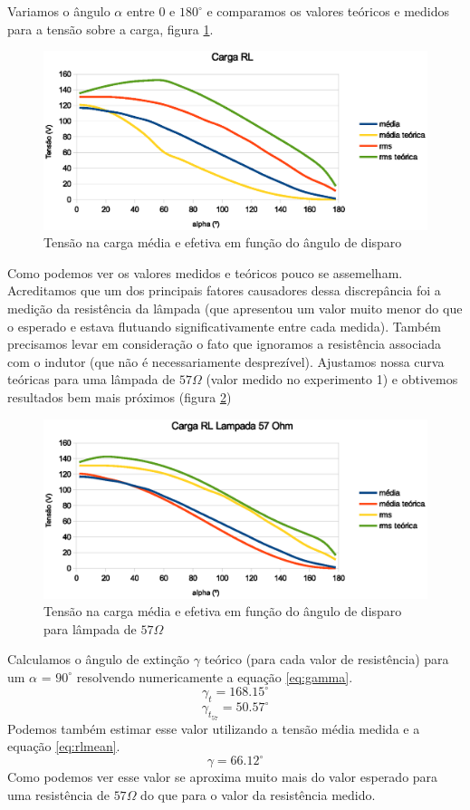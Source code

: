 \documentclass{article}
\begin{document}
Variamos o ângulo $\alpha$ entre $0$ e $180^\circ$ e comparamos os valores teóricos e medidos para a tensão sobre a carga, figura \ref{fig:rlalpha}.
\begin{figure}[H]
	\centering
	\includegraphics[width=0.7\linewidth]{dados/RL/rl_alpha}
	\caption{Tensão na carga média e efetiva em função do ângulo de disparo}
	\label{fig:rlalpha}
\end{figure}
Como podemos ver os valores medidos e teóricos pouco se assemelham. Acreditamos que um dos principais fatores causadores dessa discrepância foi a medição da resistência da lâmpada (que apresentou um valor muito menor do que o esperado e estava flutuando significativamente entre cada medida). Também precisamos levar em consideração o fato que ignoramos a resistência associada com o indutor (que não é necessariamente desprezível). Ajustamos nossa curva teóricas para uma lâmpada de $57 \Omega$ (valor medido no experimento 1) e obtivemos resultados bem mais próximos (figura \ref{fig:rlalpha57})
\begin{figure}[H]
	\centering
	\includegraphics[width=0.7\linewidth]{dados/RL/rl_alpha57Ohm}
	\caption{Tensão na carga média e efetiva em função do ângulo de disparo para lâmpada de $57 \Omega$}
	\label{fig:rlalpha57}
\end{figure}

Calculamos o ângulo de extinção $\gamma$ teórico (para cada valor de resistência) para um $\alpha$ = $90^\circ$ resolvendo numericamente a equação \ref{eq:gamma}.
\begin{equation}
	\gamma_t = 168.15^\circ
\end{equation}
\begin{equation}
\gamma_{t_{57}} = 50.57^\circ
\end{equation}
Podemos também estimar esse valor utilizando a tensão média medida e a equação \ref{eq:rlmean}.
\begin{equation}
	\gamma = 66.12^\circ
\end{equation}
Como podemos ver esse valor se aproxima muito mais do valor esperado para uma resistência de $57 \Omega$ do que para o valor da resistência medido.
\end{document}
